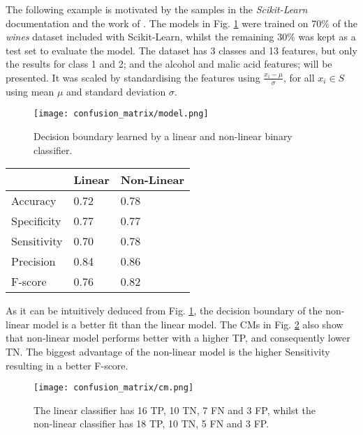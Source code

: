 The following example is motivated by the samples in the \textit{Scikit-Learn} documentation and the work of  \citep{geron2017hands}. The models in Fig. \ref{fig:cm_model} were trained on 70\% of the \textit{wines} dataset included with Scikit-Learn, whilst the remaining 30\% was kept as a test set to evaluate the model. The dataset has 3 classes and 13 features, but only the results for class 1 and 2; and the alcohol and malic acid features; will be presented. It was scaled by standardising the features using $\frac{x_i - \mu}{\sigma}$, for all $x_i \in S$ using mean $\mu$ and standard deviation $\sigma$.

\begin{figure}
  \texttt{[image: confusion\_matrix/model.png]}
  \caption{Decision boundary learned by a linear and non-linear binary classifier.}
  \label{fig:cm_model}
\end{figure}

\begin{margintable}
  \begin{tabular}{lll}
    \toprule
                 & Linear & Non-Linear \\
    \midrule
    Accuracy     & 0.72   & 0.78 \\
    Specificity  & 0.77   & 0.77 \\
    Sensitivity  & 0.70   & 0.78 \\
    Precision    & 0.84   & 0.86 \\
    F-score      & 0.76   & 0.82 \\
    \bottomrule
  \end{tabular}
  \caption{Statistics derived from the CMs in Fig. \ref{fig:cm_wines}.}
  \label{tab:cm_metrics}
\end{margintable}

As it can be intuitively deduced from Fig. \ref{fig:cm_model}, the decision boundary of the non-linear model is a better fit than the linear model. The CMs in Fig. \ref{fig:cm_wines} also show that non-linear model performs better with a higher TP, and consequently lower TN. The biggest advantage of the non-linear model is the higher Sensitivity resulting in a better F-score.

\begin{figure}
  \texttt{[image: confusion\_matrix/cm.png]}
  \caption{The linear classifier has 16 TP, 10 TN, 7 FN and 3 FP, whilst the non-linear classifier has 18 TP, 10 TN, 5 FN and 3 FP.}
  \label{fig:cm_wines}
\end{figure}


